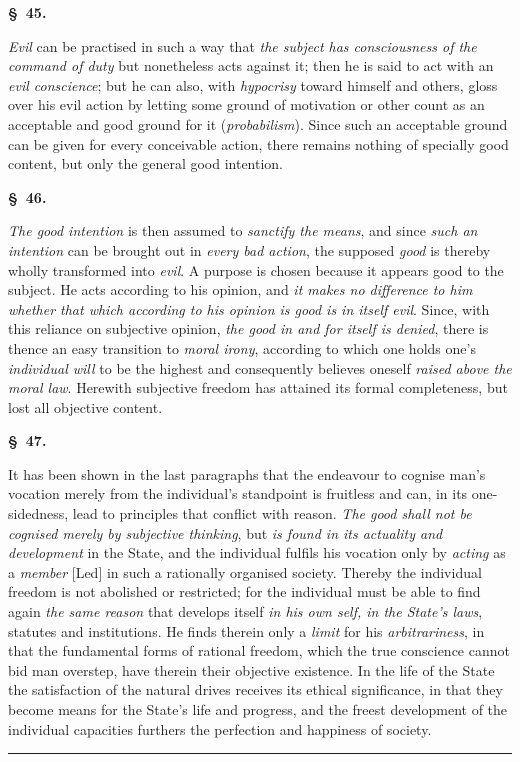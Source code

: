 \documentclass[12pt]{article}
\newcommand{\opage}[1]{\marginnote{\footnotesize\textit{[#1]}}}
\newcommand{\ombreak}{\par\medskip\begin{center}\rule{0.32\textwidth}{0.4pt}\end{center}\medskip}
\newcommand{\slaw}[1]{\par\medskip\begin{center}\textbf{\S~#1.}\end{center}\nopagebreak}
\begin{document}
\slaw{45}
\emph{Evil} can be practised in such a way that \emph{the subject has consciousness of the command of duty} but nonetheless acts against it; then he is said to act with an \emph{evil conscience}; but he can also, with \emph{hypocrisy} toward himself and others, gloss over his evil action by letting some ground of motivation or other count as an acceptable and good ground for it (\emph{probabilism}). Since such an acceptable ground can be given for every conceivable action, there remains nothing of specially good content, but only the general good intention.

\slaw{46}
\emph{The good intention} is then assumed to \emph{sanctify the means}, and \opage{162}since \emph{such an intention} can be brought out in \emph{every bad action}, the supposed \emph{good} is thereby wholly transformed into \emph{evil}. A purpose is chosen because it appears good to the subject. He acts according to his opinion, and \emph{it makes no difference to him whether that which according to his opinion is good is in itself evil}. Since, with this reliance on subjective opinion, \emph{the good in and for itself is denied}, there is thence an easy transition to \emph{moral irony}, according to which one holds one's \emph{individual will} to be the highest and consequently believes oneself \emph{raised above the moral law}. Herewith subjective freedom has attained its formal completeness, but lost all objective content.

\slaw{47}
It has been shown in the last paragraphs that the endeavour to cognise man's vocation merely from the individual's standpoint is fruitless and can, in its one-sidedness, lead to principles that conflict with reason. \emph{The good shall not be cognised merely by subjective thinking}, but \emph{is found in its actuality and development} in the State, and the individual fulfils his vocation only by \emph{acting} as a \emph{member} [Led] in such a rationally organised society. Thereby the individual freedom is not abolished or restricted; for the individual must be able to find again \emph{the same reason} that develops itself \emph{in his own self, in the State's laws}, statutes and institutions. He finds therein only a \emph{limit} for his \emph{arbitrariness}, in that the fundamental forms of rational freedom, which the true conscience cannot bid man overstep, have therein their objective existence. In the life of the State the satisfaction of the natural drives receives its ethical significance, in that they become means for the State's life and progress, and the freest development of the individual capacities furthers the perfection and happiness of society.

\ombreak
\end{document}

